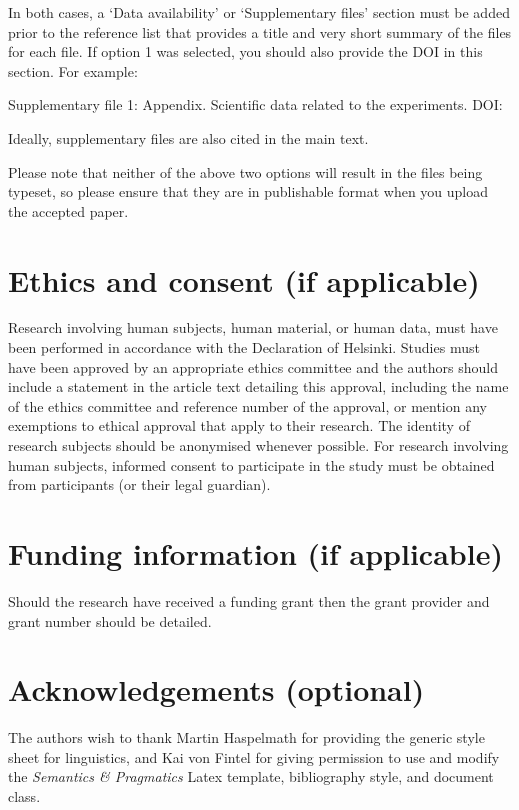 \documentclass[times,linguex,xcolor]{glossa}
\begin{document}
\noindent In both cases, a `Data availability' or `Supplementary files' section must be added prior to the reference list that provides a title and very short summary of the files for each file. If option 1 was selected, you should also provide the DOI in this section. For example:

\noindent Supplementary file 1: Appendix. Scientific data related to the experiments. DOI: 

Ideally, supplementary files are also cited in the main text.

Please note that neither of the above two options will result in the files being typeset, so please ensure that they are in publishable format when you upload the accepted paper.


\section*{Ethics and consent (if applicable)}

Research involving human subjects, human material, or human data, must have been performed in accordance with the Declaration of Helsinki. Studies must have been approved by an appropriate ethics committee and the authors should include a statement in the article text detailing this approval, including the name of the ethics committee and reference number of the approval, or mention any exemptions to ethical approval that apply to their research. The identity of research subjects should be anonymised whenever possible. For research involving human subjects, informed consent to participate in the study must be obtained from participants (or their legal guardian).


\section*{Funding information (if applicable)}

Should the research have received a funding grant then the grant provider and grant number should be detailed.

\section*{Acknowledgements (optional)}

The authors wish to thank Martin Haspelmath for providing the generic style sheet for linguistics, and Kai von Fintel for giving permission to use and modify the \textit{Semantics \& Pragmatics} Latex template, bibliography style, and document class.
\end{document}

